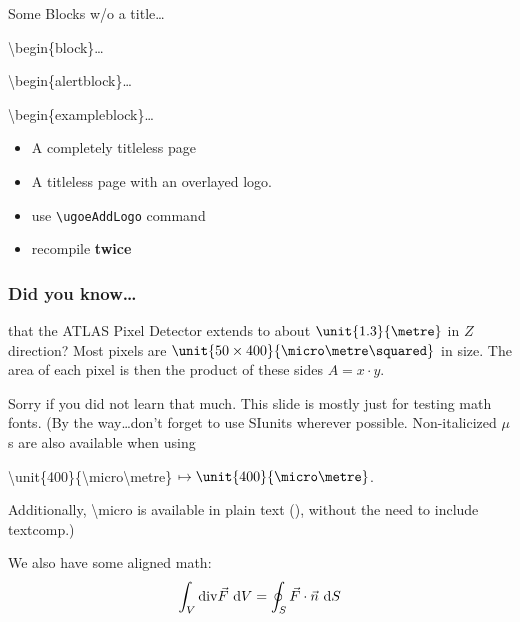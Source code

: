 \documentclass[10pt]{beamer}
\begin{document}
\begin{frame}{Some Blocks w/o a title\ldots}
  \begin{block}{}
    \textbackslash{}begin\{block\}\ldots
  \end{block}
  \begin{alertblock}{}
    \textbackslash{}begin\{alertblock\}\ldots
  \end{alertblock}
  \begin{exampleblock}{}
    \textbackslash{}begin\{exampleblock\}\ldots
  \end{exampleblock}
\end{frame}


\begin{frame}
  \begin{itemize}
    \item 
      A completely titleless page
  \end{itemize}
\end{frame}

\begin{frame}
  \ugoeAddLogo
  \begin{itemize}
    \item 
      A titleless page with an overlayed logo.
    \item
      use \texttt{\textbackslash ugoeAddLogo} command
    \item
      recompile \textbf{twice}
  \end{itemize}
\end{frame}

\begin{frame}
  \frametitle{Did you know\ldots}
  that the ATLAS Pixel Detector extends to about $\unit{1.3}{\metre}$ in $Z$ 
  direction?  Most pixels are $\unit{50\times 400}{\micro\metre\squared}$ in 
  size.
  The area of each pixel is then the product of these sides $A = x \cdot y$.

  Sorry if you did not learn that much. This slide is mostly just for testing 
  math fonts. (By the way\ldots don't forget to use SIunits wherever possible.
  Non-italicized $\mu$s are also available when using
  \begin{center}
    \textbackslash{}unit\{400\}\{\textbackslash{}micro\textbackslash{}metre\}
    $\mapsto \unit{400}{\micro\metre}$.
  \end{center}
  Additionally, \textbackslash{}micro is available in plain text (\micro), without
  the need to include textcomp.) 

  We also have some aligned math:
  \begin{align*}
    \int_{V} {\rm div}\vec F ~{\rm d}V = \oint_{S} \vec F \cdot \vec n ~\text dS
  \end{align*}
\end{frame}
\end{document}
